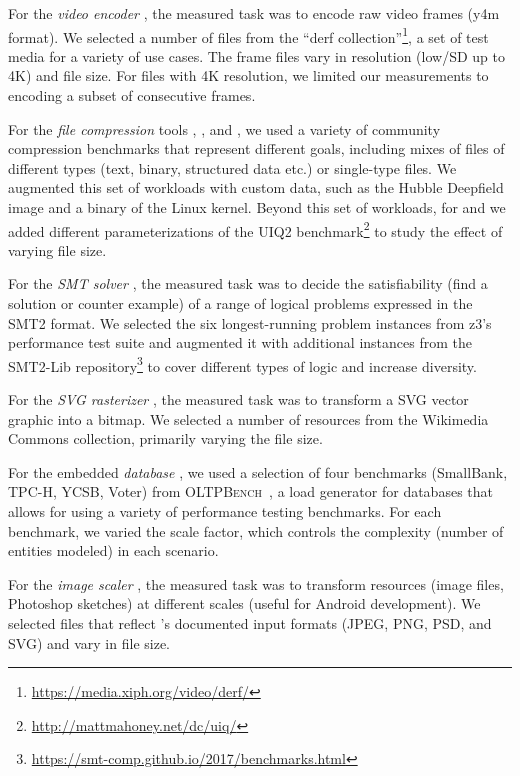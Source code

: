 {{For the \textit{video encoder} \xzwo, the measured task was to encode raw video frames (y4m format). We selected a number of files from the “derf collection”\footnote{\url{https://media.xiph.org/video/derf/}}, a set of test media for a variety of use cases. The frame files vary in resolution (low/SD up to 4K) and file size. For files with 4K resolution, we limited our measurements to encoding a subset of consecutive frames.

For the \textit{file compression} tools \kanzi, \xz, and \lrzip, we used a variety of community compression benchmarks that represent different goals, including mixes of files of different types (text, binary, structured data etc.) or single-type files. We augmented this set of workloads with custom data, such as the Hubble Deepfield image and a binary of the Linux kernel. Beyond this set of workloads, for \xz and \lrzip we added different parameterizations of the UIQ2 benchmark\footnote{\url{http://mattmahoney.net/dc/uiq/}} to study the effect of varying file size. 

For the \textit{SMT solver} \zdrei, the measured task was to decide the satisfiability (find a solution or counter example) of a range of logical problems expressed in the SMT2 format. We selected the six longest-running problem instances from z3’s performance test suite and augmented it with additional instances from the SMT2-Lib repository\footnote{\url{https://smt-comp.github.io/2017/benchmarks.html}} to cover different types of logic and increase diversity.

For the \textit{SVG rasterizer} \batik, the measured task was to transform a SVG vector graphic into a bitmap. We selected a number of resources from the Wikimedia Commons collection, primarily varying the file size.

For the embedded \textit{database} \htwo, we used a selection of four benchmarks (SmallBank, TPC-H, YCSB, Voter) from \textsc{OLTPBench}~\cite{difallah_oltp_2013}, a load generator for databases that allows for using a variety of performance testing benchmarks. For each benchmark, we varied the scale factor, which controls the complexity (number of entities modeled) in each scenario.

For the \textit{image scaler} \dconvert, the measured task was to transform resources (image files, Photoshop sketches) at different scales (useful for Android development). We selected files that reflect \dconvert's documented input formats (JPEG, PNG, PSD, and SVG) and vary in file size.
}

}
